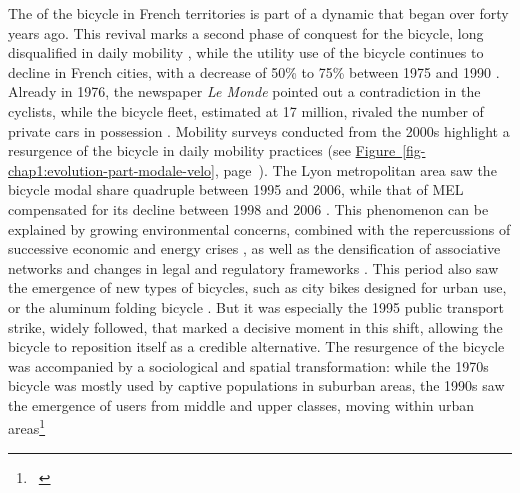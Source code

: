 \begin{refsegment}
The  of the bicycle in French territories \textcolor{blue}{\autocites[137-168]{heran_retour_2015}[44]{eskenazi_voir_2022}} is part of a dynamic that began over forty years ago. This revival marks a second phase of conquest for the bicycle, long disqualified in daily mobility \textcolor{blue}{\autocite[26]{papon_retour_2012}}, while the utility use of the bicycle continues to decline in French cities, with a decrease of 50\% to 75\% between 1975 and 1990 \textcolor{blue}{\autocite[48]{certu_usagers_2013}}. Already in 1976, the newspaper \textsl{Le Monde} pointed out a contradiction in  the  cyclists, while the bicycle fleet, estimated at 17 million, rivaled the number of private cars in possession \textcolor{blue}{\autocite{ambroise-rendu_creation_1976}}. Mobility surveys conducted from the 2000s highlight a resurgence of the bicycle in daily mobility practices (see \hyperref[fig-chap1:evolution-part-modale-velo]{Figure~\ref{fig-chap1:evolution-part-modale-velo}}, page~\pageref{fig-chap1:evolution-part-modale-velo}). The Lyon metropolitan area saw the bicycle modal share quadruple between 1995 and 2006, while that of \acrfull{MEL} compensated for its decline between 1998 and 2006 \textcolor{blue}{\autocite[243]{dauncey_french_2012}}. This phenomenon can be explained by growing environmental concerns, combined with the repercussions of successive economic and energy crises \textcolor{blue}{\autocite[138]{heran_retour_2015}}, as well as the densification of associative networks and changes in legal and regulatory frameworks \textcolor{blue}{\autocite[55]{sebban_complementarite_2003}}. This period also saw the emergence of new types of bicycles, such as city bikes designed for urban use, or the aluminum folding bicycle  \textcolor{blue}{\autocite[55]{sebban_complementarite_2003}}. But it was especially the 1995 public transport strike, widely followed, that marked a decisive moment in this shift, allowing the bicycle to reposition itself as a credible alternative. The resurgence of the bicycle was accompanied by a sociological and spatial transformation: while the 1970s bicycle was mostly used by captive populations in suburban areas, the 1990s saw the emergence of users from middle and upper classes, moving within urban areas\footnote{~
}
\end{refsegment}
